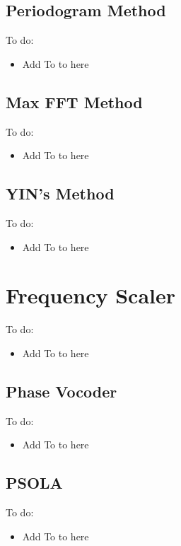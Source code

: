 \subsection{Periodogram Method}

\color{red}
To do:
\begin{itemize}
	\item Add To to here
\end{itemize}
\color{black}

\subsection{Max FFT Method}

\color{red}
To do:
\begin{itemize}
	\item Add To to here
\end{itemize}
\color{black}

\subsection{YIN's Method}

\color{red}
To do:
\begin{itemize}
	\item Add To to here
\end{itemize}
\color{black}

\section{Frequency Scaler}

\color{red}
To do:
\begin{itemize}
	\item Add To to here
\end{itemize}
\color{black}

\subsection{Phase Vocoder}

\color{red}
To do:
\begin{itemize}
	\item Add To to here
\end{itemize}
\color{black}

\subsection{PSOLA}

\color{red}
To do:
\begin{itemize}
	\item Add To to here
\end{itemize}
\color{black}
